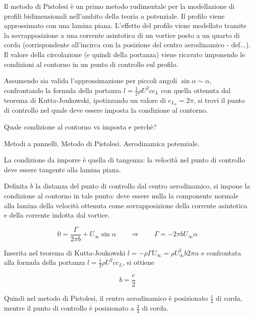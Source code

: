 
\begin{exerciseS}
Il metodo di Pistolesi è un primo metodo rudimentale per la modellazione di profili
bidimensionali nell'ambito della teoria a potenziale. Il profilo viene approssimato con una lamina piana. 
L'effetto del profilo viene modellato tramite la sovrapposizione a una corrente asintotica di un vortice posto a un quarto di corda (corrispondente all'incirca con la posizione del centro aerodinamico - def...). Il valore della circolazione (e quindi della portanza) viene ricavato imponendo le condizioni al contorno in un punto di controllo sul profilo.

Assumendo sia valida l'approssimazione per piccoli angoli $\sin \alpha \sim \alpha$, confrontando la formula della portanza $l = \frac{1}{2} \rho U^2 c c_L$ con quella ottenuta dal teorema di Kutta-Joukowski, ipotizzando un valore di $c_{L_\alpha} = 2\pi$,
si trovi il punto di controllo nel quale deve essere imposta la condizione al contorno.

Quale condizione al contorno va imposta e perchè?
\end{exerciseS}


\sol

\partone Metodi a pannelli. Metodo di Pistolesi. Aerodinamica potenziale.
  
\parttwo
La condizione da imporre è quella di tangenza: la velocità nel punto di controllo deve essere tangente alla lamina piana.

Definita $b$ la distanza del punto di controllo dal centro aerodinamico, si impone la condizione al contorno in tale punto: deve essere nulla la componente normale alla lamina della velocità ottenuta come sovrapposizione della corrente asintotica e della corrente indotta dal vortice.

\begin{equation}
  0 = \frac{\Gamma}{2\pi b} + U_\infty \sin \alpha \qquad \Rightarrow \qquad 
  \Gamma = - 2\pi b U_\infty \alpha
\end{equation}

Inserita nel teorema di Kutta-Joukowski  $l = -\rho \Gamma U_\infty = \rho U_\infty^2 b 2\pi \alpha$ e confrontata alla formula della portanza $l = \frac{1}{2} \rho U^2 c c_L$, si ottiene

\begin{equation}
  b = \frac{c}{2}
\end{equation}

Quindi nel metodo di Pistolesi, il centro aerodinamico è posizionato $\frac{1}{4}$  di corda, mentre il punto di controllo è posizionato a $\frac{3}{4}$ di corda.

